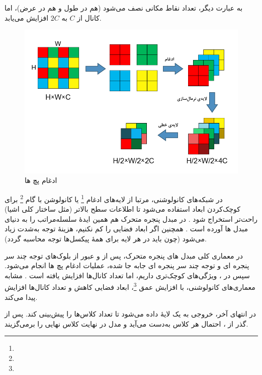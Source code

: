 به عبارت دیگر، تعداد نقاط مکانی نصف می‌شود (هم در طول و هم در عرض)، 
اما کانال از \(\displaystyle C\) به \(\displaystyle 2C\) افزایش می‌یابد.

\begin{figure}[h]
	\centering
	\begin{minipage}[b]{1\textwidth}
		\centering
		\includegraphics[width=\textwidth]{transformer_images/persian images/b12.png}
		\caption{ادغام پچ ها}
		\label{fig:patch merging in Swin Transformer}
	\end{minipage}
	\hfill
\end{figure}

در شبکه‌های کانولوشنی، مرتبا از لایه‌های ادغام \footnote{} یا کانولوشن با گام \footnote{} 
برای کوچک‌کردن ابعاد استفاده می‌شود تا اطلاعات سطح بالاتر (مثل ساختار کلی اشیا) راحت‌تر استخراج شود \cite{he2016deep}.  در مبدل پنجره متحرک هم همین ایدهٔ سلسله‌مراتب را به دنیای مبدل ها آورده است \cite{liu2021swintransformer}.  
همچنین اگر ابعاد فضایی را کم نکنیم، هزینهٔ توجه به‌شدت زیاد می‌شود 
(چون باید در هر لایه برای همهٔ پیکسل‌ها توجه محاسبه گردد).

در معماری کلی مبدل های پنجره متحرک، پس از  و عبور از بلوک‌های توجه چند سر پنجره ای و توجه چند سر پنجره ای جابه جا شده، عملیات  ادغام پچ ها انجام می‌شود. سپس در ، ویژگی‌های کوچک‌تری داریم، اما تعداد کانال‌ها افزایش یافته است \cite{liu2021swintransformer}.  
مشابه معماری‌های کانولوشنی، با افزایش عمق \footnote{}، ابعاد فضایی کاهش و تعداد کانال‌ها افزایش پیدا می‌کند.

در انتهای  آخر، خروجی به یک لایهٔ  داده می‌شود تا تعداد کلاس‌ها را پیش‌بینی کند.  
پس از گذر از ، احتمال هر کلاس به‌دست می‌آید و مدل در نهایت کلاس نهایی را برمی‌گزیند.






